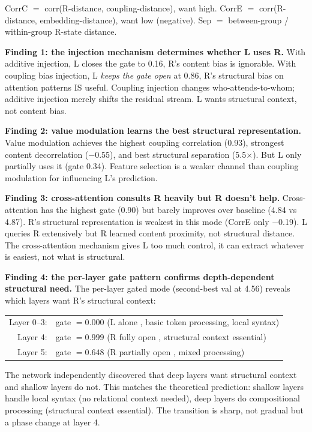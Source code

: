 \documentclass[11pt, a4paper]{article}
\theoremstyle{plain}
\theoremstyle{definition}
\theoremstyle{remark}
\begin{document}
\noindent CorrC $=$ corr(R-distance, coupling-distance), want high.
CorrE $=$ corr(R-distance, embedding-distance), want low (negative).
Sep $=$ between-group / within-group R-state distance.

\textbf{Finding 1: the injection mechanism determines whether L uses R.}
With additive injection, L closes the gate to 0.16, R's content bias is ignorable.
With coupling bias injection, L \emph{keeps the gate open} at 0.86, R's structural bias on attention patterns IS useful.
Coupling injection changes who-attends-to-whom; additive injection merely shifts the residual stream.
L wants structural context, not content bias.

\textbf{Finding 2: value modulation learns the best structural representation.}
Value modulation achieves the highest coupling correlation (0.93), strongest content decorrelation ($-$0.55), and best structural separation (5.5$\times$).
But L only partially uses it (gate 0.34).
Feature selection is a weaker channel than coupling modulation for influencing L's prediction.

\textbf{Finding 3: cross-attention consults R heavily but R doesn't help.}
Cross-attention has the highest gate (0.90) but barely improves over baseline (4.84 vs 4.87).
R's structural representation is weakest in this mode (CorrE only $-$0.19).
L queries R extensively but R learned content proximity, not structural distance.
The cross-attention mechanism gives L too much control, it can extract whatever is easiest, not what is structural.

\textbf{Finding 4: the per-layer gate pattern confirms depth-dependent structural need.}
The per-layer gated mode (second-best val at 4.56) reveals which layers want R's structural context:

\begin{center}\small
\begin{tabular}{rl}
Layer 0--3: & gate $= 0.000$ \quad (L alone ,  basic token processing, local syntax) \\
Layer 4: & gate $= 0.999$ \quad (R fully open ,  structural context essential) \\
Layer 5: & gate $= 0.648$ \quad (R partially open ,  mixed processing) \\
\end{tabular}
\end{center}

\noindent The network independently discovered that deep layers want structural context and shallow layers do not.
This matches the theoretical prediction: shallow layers handle local syntax (no relational context needed), deep layers do compositional processing (structural context essential).
The transition is sharp, not gradual but a phase change at layer 4.
\end{document}

